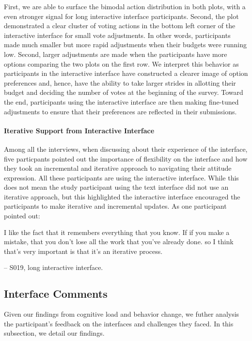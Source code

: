 First, we are able to surface the bimodal action distribution in both plots, with a even stronger signal for long interactive interface participants. Second, the plot demonstrated a clear cluster of voting actions in the bottom left corner of the interactive interface for small vote adjustments. In other words, participants made much smaller but more rapid adjustments when their budgets were running low. Second, larger adjustments are made when the participants have more options comparing the two plots on the first row. We interpret this behavior as participants in the interactive interface have constructed a clearer image of option preferences and, hence, have the ability to take larger strides in allotting their budget and deciding the number of votes at the beginning of the survey. Toward the end, participants using the interactive interface are then making fine-tuned adjustments to ensure that their preferences are reflected in their submissions.

\paragraph{Iterative Support from Interactive Interface}
Among all the interviews, when discussing about their experience of the interface, five particpants pointed out the importance of flexibility on the interface and how they took an incremental and iterative approach to navigating their attitude expression. All these participants are using the interactive interface. While this does not mean the study participant using the text interface did not use an iterative approach, but this highlighted the interactive interface encouraged the participants to make iterative and incremental updates. As one participant pointed out:

\begin{displayquote}
I like the fact that it remembers everything that you know. If if you make a mistake, that you don't lose all the work that you've already done. so I think that's very important is that it's an iterative process.

\noindent \hfill -- S019, long interactive interface.
\end{displayquote}

\subsection{Interface Comments}
Given our findings from cognitive load and behavior change, we futher analysis the participant's feedback on the interfaces and challenges they faced. In this subsection, we detail our findings.


